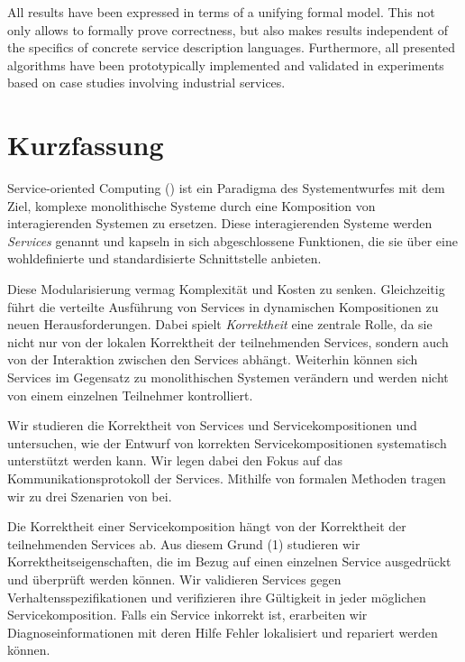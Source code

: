 All results have been expressed in terms of a unifying formal model. This not only allows to formally prove correctness, but also makes results independent of the specifics of concrete service description languages. Furthermore, all presented algorithms have been prototypically implemented and validated in experiments based on case studies involving industrial services.


\newpage




\section*{Kurzfassung}

Service-oriented Computing () ist ein Paradigma des Systementwurfes mit dem Ziel, komplexe monolithische Systeme durch eine Komposition von interagierenden Systemen zu ersetzen. Diese interagierenden Systeme werden \emph{Services} genannt und kapseln in sich abgeschlossene Funktionen, die sie \"uber eine wohldefinierte und standardisierte Schnittstelle anbieten.

Diese Modularisierung vermag Komplexit\"at und Kosten zu senken. Gleichzeitig f\"uhrt die verteilte Ausf\"uhrung von Services in dynamischen Kompositionen zu neuen Herausforderungen. Dabei spielt \emph{Korrektheit} eine zentrale Rolle, da sie nicht nur von der lokalen Korrektheit der teilnehmenden Services, sondern auch von der Interaktion zwischen den Services abh\"angt. Weiterhin k\"onnen sich Services im Gegensatz zu monolithischen Systemen ver\"andern und werden nicht von einem einzelnen Teilnehmer kontrolliert.

Wir studieren die Korrektheit von Services und Servicekompositionen und untersuchen, wie der Entwurf von korrekten Servicekompositionen systematisch unterst\"utzt werden kann. Wir legen dabei den Fokus auf das Kommunikationsprotokoll der Services. Mithilfe von formalen Methoden tragen wir zu drei Szenarien von  bei.

Die Korrektheit einer Servicekomposition h\"angt von der Korrektheit der teilnehmenden Services ab. Aus diesem Grund (1) studieren wir Korrektheitseigenschaften, die im Bezug auf einen einzelnen Service ausgedr\"uckt und \"uberpr\"uft werden k\"onnen. Wir validieren Services gegen Verhaltensspezifikationen und verifizieren ihre G\"ultigkeit in jeder m\"oglichen Servicekomposition. Falls ein Service inkorrekt ist, erarbeiten wir Diagnoseinformationen mit deren Hilfe Fehler lokalisiert und repariert werden k\"onnen.

